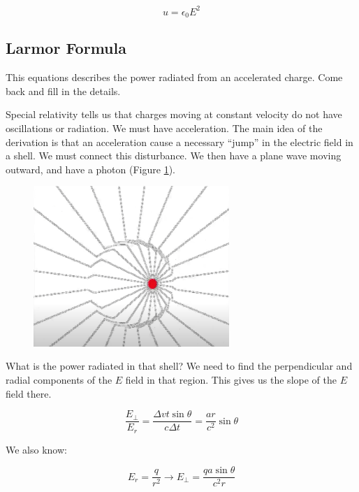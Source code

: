 \documentclass{article}
\begin{document}
\begin{equation}
    \boxed{u = \epsilon_0 E^2}
\end{equation}


\subsection{Larmor Formula}

This equations describes the power radiated from an accelerated charge. Come back and fill in the details. 

Special relativity tells us that charges moving at constant velocity do not have oscillations or radiation. We must have acceleration. The main idea of the derivation is that an acceleration cause a necessary ``jump'' in the electric field in a shell. We must connect this disturbance. We then have a plane wave moving outward, and have a photon (Figure \ref{fig:no}).

\begin{figure}
    \centering
    \includegraphics[width=0.66\textwidth]{Screen Shot 2020-09-02 at 10.45.56 PM.png}
    \caption{}
    \label{fig:no}
\end{figure}

What is the power radiated in that shell? We need to find the perpendicular and radial components of the $E$ field in that region. This gives us the slope of the $E$ field there. 

\begin{equation}
    \frac{E_\perp}{E_r} = \frac{\Delta v t \sin{\theta}}{c \Delta t} = \frac{ar}{c^2} \sin{\theta}
\end{equation}

We also know:

\begin{equation}
    E_r = \frac{q}{r^2} \rightarrow E_\perp = \frac{qa \sin{\theta}}{c^2 r}
\end{equation}
\end{document}
